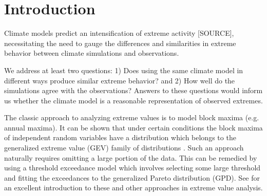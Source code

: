 \section{Introduction}
\label{intro}


Climate models predict an intensification of extreme activity [SOURCE], necessitating the need to gauge the differences and similarities in extreme behavior between climate simulations and observations.


We address at least two questions: 1) Does using the same climate model in different ways produce similar extreme behavior? and 2) How well do the simulations agree with the observations? Answers to these questions would inform us whether the climate model is a reasonable representation of observed extremes.



The classic approach to analyzing extreme values is to model block maxima (e.g. annual maxima). It can be shown that under certain conditions the block maxima of independent random variables have a distribution which belongs to the generalized extreme value (GEV) family of distributions \citep{coles2001introduction}. Such an approach naturally requires omitting a large portion of the data. This can be remedied by using a threshold exceedance model which involves selecting some large threshold and fitting the exceedances to the generalized Pareto distribution (GPD). See \cite{coles2001introduction} for an excellent introduction to these and other approaches in extreme value analysis.

